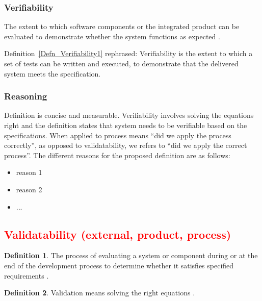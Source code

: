 \documentclass[letterpaper, cleveref]{lipics-v2019}
\newcommand{\authornote}[3]{\textcolor{#1}{[#3 ---#2]}}
\newcommand{\authornote}[3]{}
\newcommand{\oo}[1]{\authornote{magenta}{OO}{#1}} %
\newcommand{\notdone}[1]{\textcolor{red}{#1}}
\theoremstyle{definition}
\newtheorem{defn}{Definition}
\begin{document}
\begin{mybox}
\subsubsection*{Verifiability} The extent to which software components or the
integrated product can be evaluated to demonstrate whether the system functions
as expected \citep{wiegers2003softreq}. 

Definition~\ref{Defn_Verifiability1}
rephrased: Verifiability is the extent to which a set of tests can be
written and executed, to demonstrate that the delivered system meets the
specification.
\end{mybox}

\subsubsection*{Reasoning} 

Definition is concise and measurable.  Verifiability involves solving the
equations right \citep[p.~23]{Roache1998} and the definition states that system
needs to be verifiable based on the specifications.  When applied to process
means ``did we apply the process correctly'', as opposed to validatability, we
refers to ``did we apply the correct process''.   The different reasons for the
proposed definition are as follows:

\begin{itemize}
  \item reason 1
  \item reason 2
  \item ...
\end{itemize}


\subsection{\notdone{Validatability (external, product, process)}} %

\begin{defn} \label{Defn_Validatability}
  The process of evaluating a system or component during or at the end of the
  development process to determine whether it satisfies specified requirements
  \citep{IEEEStdGlossarySET1990}.
\end{defn}

\begin{defn}
  Validation means solving the right equations \citep[p.~23]{Roache1998}.
\end{defn}
\end{document}
